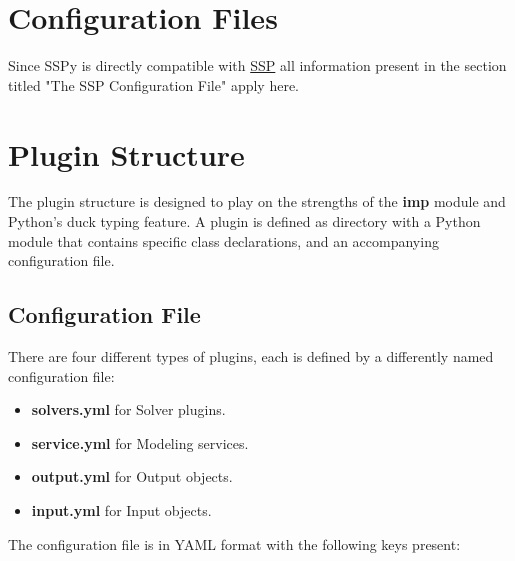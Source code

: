\documentclass[12pt]{article}
\begin{document}
\section*{Configuration Files}

Since SSPy is directly compatible with \href{../ssp/ssp.tex}{SSP} all information present in the section titled "The SSP Configuration File" apply here. 

\section*{Plugin Structure}

The plugin structure is designed to play on the strengths of the {\bf imp} module and Python's duck typing feature. A plugin is defined as directory with a Python module that contains specific class declarations, and an accompanying configuration file. 

\subsection*{Configuration File}

There are four different types of plugins, each is defined by a differently named configuration file:

\begin{itemize}
	\item[] {\bf solvers.yml} for Solver plugins.
	\item[] {\bf service.yml} for Modeling services.
	\item[] {\bf output.yml} for Output objects.
	\item[] {\bf input.yml} for Input objects.
\end{itemize}

The configuration file is in YAML format with the following keys present:
\end{document}
